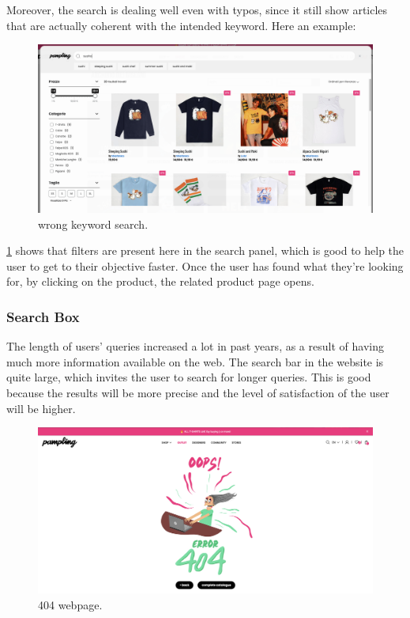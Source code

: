 Moreover, the search is dealing well even with typos, since it still show articles that are actually coherent with the 
intended keyword. Here an example:
\begin{figure}[h!]
	\centering
	\includegraphics[scale=0.225]{images/wrong-search.png}
	\caption{wrong keyword search.}
	\label{fig:wrong-search}
\end{figure}

\cref{fig:wrong-search} shows that filters are present here in the search panel, which is good to 
help the user to get to their objective faster.
Once the user has found what they're looking for, by clicking on the product, the related product page opens.

\subsubsection{Search Box}
The length of users' queries increased a lot in past years, as a result of having much more information available on the web.
The search bar in the website is quite large, which invites the user to search for longer queries. This is good because 
the results will be more precise and the level of satisfaction of the user will be higher. 

\begin{figure}[h!]
	\centering
	\includegraphics[scale=0.225]{images/404.png}
	\caption{404 webpage.}
	\label{fig:404}
\end{figure}
